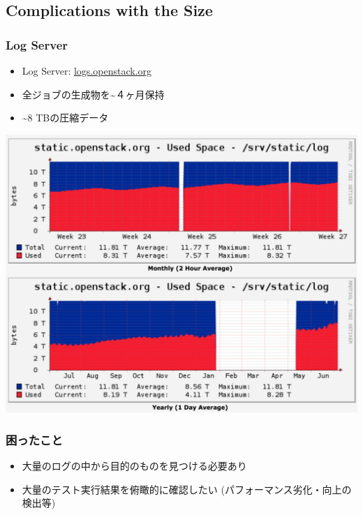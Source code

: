 \documentclass[aspectratio=169,11pt,hyperref={colorlinks=true}]{beamer}
\begin{document}
\subsection{Complications with the Size}
\begin{frame}
  \frametitle{Log Server}
  \begin{itemize}
    \item Log Server: \href{http://logs.openstack.org/}{logs.openstack.org}
    \item 全ジョブの生成物を\textasciitilde４ヶ月保持
    \item \textasciitilde8 TBの圧縮データ
  \end{itemize}
  \begin{center}
    \includegraphics[width=.55\textwidth]{cacti-static-openstack-org-log-graph.png}
  \end{center}
\end{frame}

\begin{frame}
  \frametitle{困ったこと}
  \begin{itemize}
    \item 大量のログの中から目的のものを見つける必要あり
    \item 大量のテスト実行結果を俯瞰的に確認したい (パフォーマンス劣化・向上の検出等)
  \end{itemize}
\end{frame}
\end{document}

